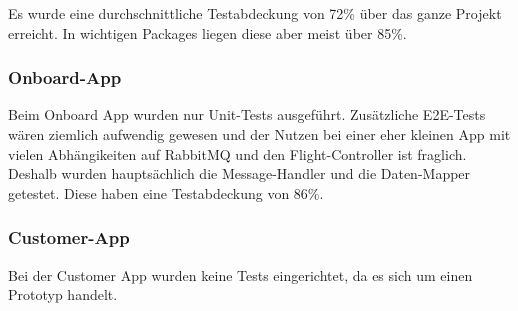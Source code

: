 Es wurde eine durchschnittliche Testabdeckung von 72\% über das ganze Projekt erreicht. In wichtigen Packages liegen diese aber meist über 85\%.

\subsubsection{Onboard-App}

Beim Onboard App wurden nur Unit-Tests ausgeführt. Zusätzliche E2E-Tests wären ziemlich aufwendig gewesen und der Nutzen bei einer eher kleinen App mit vielen Abhängikeiten auf RabbitMQ und den Flight-Controller ist fraglich. Deshalb wurden hauptsächlich die Message-Handler und die Daten-Mapper getestet. Diese haben eine Testabdeckung von 86\%.

\subsubsection{Customer-App}

Bei der Customer App wurden keine Tests eingerichtet, da es sich um einen Prototyp handelt.


